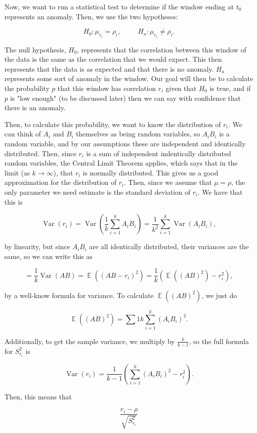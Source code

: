 \documentclass{article}
\DeclareMathOperator{\E}{\mathbb{E}}
\DeclareMathOperator{\Var}{\mathrm{Var}}
\begin{document}
Now, we want to run a statistical test to determine if the window ending at $t_0$ represents an anomaly. Then, we use the two hypotheses:

$$H_0: \mu_{r_i} = \rho_i,
~~~~~~~~~~~
H_a: \mu_{r_i} \ne \rho_i.$$

The null hypothesis, $H_0$, represents that the correlation between this window of the data is the same as the correlation that we would expect. This then represents that the data is as expected and that there is no anomaly. $H_a$ represents some sort of anomaly in the window. Our goal will then be to calculate the probability $p$ that this window has correlation $r_i$ given that $H_0$ is true, and if $p$ is "low enough" (to be discussed later) then we can say with confidence that there is an anomaly.

Then, to calculate this probability, we want to know the distribution of $r_i$. We can think of $A_i$ and $B_i$ themselves as being random variables, so $A_i B_i$ is a random variable, and by our assumptions these are independent and identically distributed. Then, since $r_i$ is a sum of independent indentically distributed random variables, the Central Limit Theorem applies, which says that in the limit (as $k \to \infty$), that $r_i$ is normally distributed. This gives us a good approximation for the distribution of $r_i$. Then, since we assume that $\mu = \rho$, the only parameter we need estimate is the standard deviation of $r_i$. We have that this is

$$\Var(r_i) = \Var(\frac{1}{k} \sum_{i = 1}^k A_i B_i) = \frac{1}{k^2} \sum_{i =1}^k \Var(A_i B_i),$$

by linearity, but since $A_i B_i$ are all identically distributed, their variances are the same, so we can write this as

$$ = \frac{1}{k} \Var(AB) = \E((AB - r_i)^2) = \frac{1}{k}\left(\E((AB)^2) - r_i^2\right),$$

by a well-know formula for variance. To calculate $\E((AB)^2)$, we just do

$$\E((AB)^2) = \sum{1}{k} \sum_{i=1}^k (A_i B_i)^2.$$

Additionally, to get the sample variance, we multiply by $\frac{k}{k-1}$, so the full formula for $S^2_{r_i}$ is

$$\Var(r_i) = \frac{1}{k-1}\left(\sum_{i=1}^k (A_i B_i)^2 - r_i^2\right).$$

Then, this means that

$$\frac{r_i - \rho}{\sqrt{S^2_{r_i}}}$$
\end{document}

